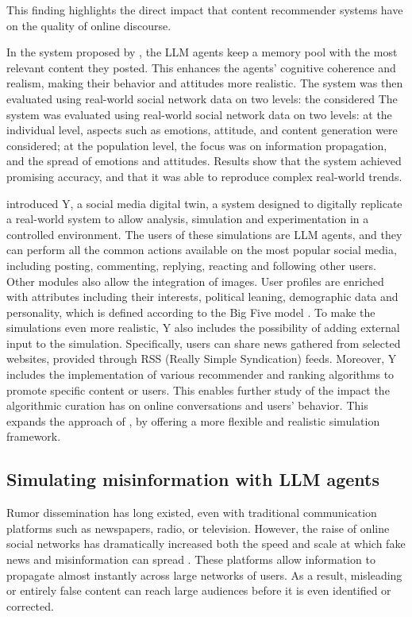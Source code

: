 This finding highlights the direct impact that content recommender systems have on the quality of online discourse.
\medskip

In the system proposed by \citet{gao2023s3socialnetworksimulationlarge}, the LLM agents keep a memory pool with the most relevant content they posted. This enhances the agents' cognitive coherence and realism, making their behavior and attitudes more realistic.
The system was then evaluated using real-world social network data on two levels: the considered The system was evaluated using real-world social network data on two levels: at the individual level, aspects such as emotions, attitude, and content generation were considered; at the population level, the focus was on information propagation, and the spread of emotions and attitudes. 
Results show that the system achieved promising accuracy, and that it was able to reproduce complex real-world trends.

\medskip
\citet{rossetti2024ysocialllmpoweredsocial} introduced Y, a social media digital twin, a system designed to digitally replicate a real-world system to allow analysis, simulation and experimentation in a controlled environment.
The users of these simulations are LLM agents, and they can perform all the common actions available on the most popular social media, including posting, commenting, replying, reacting and following other users. Other modules also allow the integration of images.
User profiles are enriched with attributes including their interests, political leaning, demographic data and personality, which is defined according to the Big Five model \cite{barrick1991bigfive, McCrae1992}.
To make the simulations even more realistic, Y also includes the possibility of adding external input to the simulation. Specifically, users can share news gathered from selected websites, provided through RSS (Really Simple Syndication) feeds.
Moreover, Y includes the implementation of various recommender and ranking algorithms to promote specific content or users. This enables further study of the impact the algorithmic curation has on online conversations and users' behavior. This expands the approach of \citet{törnberg2023evaluate}, by offering a more flexible and realistic simulation framework.



\subsection{Simulating misinformation with LLM agents}
Rumor dissemination has long existed, even with traditional communication platforms such as newspapers, radio, or television. However, the raise of online social networks has dramatically increased both the speed and scale at which fake news and misinformation can spread \cite{aimeur2023fake}. These platforms allow information to propagate almost instantly across large networks of users. As a result, misleading or entirely false content can reach large audiences before it is even identified or corrected.

